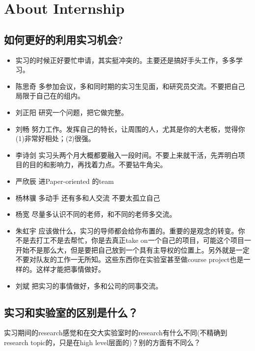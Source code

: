 \documentclass{vivid_layout}
\begin{document}
\section{About Internship}
\addtocounter{section}{1}
\setcounter{subsection}{0}

\subsection{如何更好的利用实习机会?}
\begin{itemize}
\item 实习的时候正好要忙申请，其实挺冲突的。主要还是搞好手头工作，多多学习。
\item { 陈思奇} \quad 多参加会议，多和同时期的实习生见面，和研究员交流。不要把自己局限于自己在的组内。
\item  { 刘正阳}  \quad 研究一个问题，把它做完整。
\item  { 刘畅}  \quad 努力工作。发挥自己的特长，让周围的人，尤其是你的大老板，觉得你(1)非常好相处；(2)很强。
\item  { 李诗剑}  \quad 实习头两个月大概都要融入一段时间。不要上来就干活，先弄明白项目的目的和影响力，再找着力点。不要钻牛角尖。
\item  { 严欣辰}  \quad 进Paper-oriented 的team
\item  { 杨林骥}  \quad 多动手 还有多和人交流 不要太孤立自己
\item  { 杨宽}  \quad 尽量多认识不同的老师，和不同的老师多交流。
\item  { 朱虹宇}  \quad 应该做什么，实习的导师都会给你布置的。重要的是观念的转变。你不是去打工不是去帮忙，你是去真正take on一个自己的项目，可能这个项目一开始不是那么大，但是要把自己放到一个具有主导权的位置上。另外就是一定不要对队友的工作一无所知。这些东西你在实验室甚至做course project也是一样的。这样才能把事情做好。
\item  { 刘斌}  \quad 把实习的事情做好，多和公司的同事交流。
\end{itemize}

\subsection{实习和实验室的区别是什么？}
实习期间的research感觉和在交大实验室时的research有什么不同(不精确到research topic的，只是在high level层面的)？别的方面有不同么？
\end{document}

